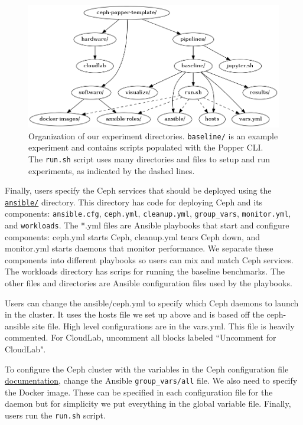 \begin{figure}[tb] 
  \centering
  \includegraphics[width=1\linewidth]{./figures/expdir.png}
  \caption{Organization of our experiment directories. \texttt{baseline/} is an
example experiment and contains scripts populated with the Popper CLI. The
\texttt{run.sh} script uses many directories and files to setup and run
experiments, as indicated by the dashed lines.}
  \label{fig:expdir}
\end{figure}



Finally, users specify the Ceph services that should be deployed using the
\href{https://github.com/michaelsevilla/ceph-popper-template/tree/master/pipelines/baseline/ansible}{\texttt{ansible/}}
directory. This directory has code for deploying Ceph and its components:
\texttt{ansible.cfg}, \texttt{ceph.yml}, \texttt{cleanup.yml},
\texttt{group\_vars}, \texttt{monitor.yml}, and \texttt{workloads}. The *.yml
files are Ansible playbooks that start and configure components: ceph.yml
starts Ceph, cleanup.yml tears Ceph down, and monitor.yml starts daemons that
monitor performance. We separate these components into different playbooks so
users can mix and match Ceph services. The workloads directory has scrips for
running the baseline benchmarks. The other files and directories are Ansible
configuration files used by the playbooks.

Users can change the ansible/ceph.yml to specify which Ceph daemons to launch
in the cluster. It uses the hosts file we set up above and is based off the
ceph-ansible site file. High level configurations are in the vars.yml. This
file is heavily commented. For CloudLab, uncomment all blocks labeled
``Uncomment for CloudLab".

To configure the Ceph cluster with the variables in the Ceph configuration file
\href{http://docs.ceph.com/docs/jewel/rados/configuration/ceph-conf/}{documentation},
change the Ansible \texttt{group\_vars/all} file. We also need to specify the
Docker image. These can be specified in each configuration file for the daemon
but for simplicity we put everything in the global variable file. Finally,
users run the \texttt{run.sh} script. 

